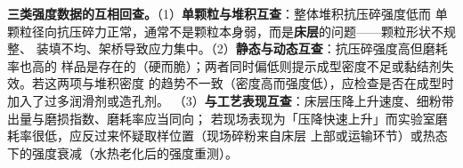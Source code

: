 \begin{crosscheck}
\textbf{三类强度数据的互相回查。}（1）\textbf{单颗粒与堆积互查}：整体堆积抗压碎强度低而
单颗粒径向抗压碎力正常，通常不是颗粒本身弱，而是\textbf{床层}的问题——颗粒形状不规整、
装填不均、架桥导致应力集中。（2）\textbf{静态与动态互查}：抗压碎强度高但磨耗率也高的
样品是存在的（硬而脆）；两者同时偏低则提示成型密度不足或黏结剂失效。若这两项与堆积密度
的趋势不一致（密度高而强度低），应检查是否在成型时加入了过多润滑剂或造孔剂。
（3）\textbf{与工艺表现互查}：床层压降上升速度、细粉带出量与磨损指数、磨耗率应当同向；
若现场表现为「压降快速上升」而实验室磨耗率很低，应反过来怀疑取样位置（现场碎粉来自床层
上部或运输环节）或热态下的强度衰减（水热老化后的强度重测）。
\end{crosscheck}

